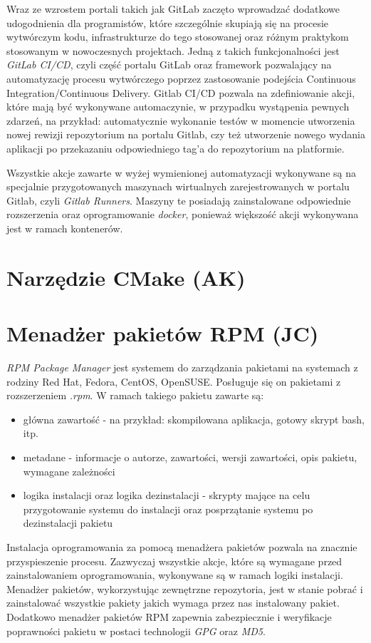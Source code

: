Wraz ze wzrostem portali takich jak GitLab zaczęto wprowadzać dodatkowe udogodnienia dla programistów, które szczególnie skupiają się na procesie wytwórczym kodu, infrastrukturze do tego stosowanej oraz różnym praktykom stosowanym w nowoczesnych projektach. Jedną z takich funkcjonalności jest \emph{GitLab CI/CD}, czyli część portalu GitLab oraz framework pozwalający na automatyzację procesu wytwórczego poprzez zastosowanie podejścia Continuous Integration/Continuous Delivery. Gitlab CI/CD pozwala na zdefiniowanie akcji, które mają być wykonywane automaczynie, w przypadku wystąpenia pewnych zdarzeń, na przykład: automatycznie wykonanie testów w momencie utworzenia nowej rewizji repozytorium na portalu Gitlab, czy też utworzenie nowego wydania aplikacji po przekazaniu odpowiedniego tag'a do repozytorium na platformie.

Wszystkie akcje zawarte w wyżej wymienionej automatyzacji wykonywane są na specjalnie przygotowanych maszynach wirtualnych zarejestrowanych w portalu Gitlab, czyli \emph{Gitlab Runners}. Maszyny te posiadają zainstalowane odpowiednie rozszerzenia oraz oprogramowanie \emph{docker}, ponieważ większość akcji wykonywana jest w ramach kontenerów.

\section{Narzędzie CMake (AK)}


\section{Menadżer pakietów RPM (JC)}
\emph{RPM Package Manager} jest systemem do zarządzania pakietami na systemach z rodziny Red Hat, Fedora, CentOS, OpenSUSE. Posługuje się on pakietami z rozszerzeniem \emph{.rpm}. W ramach takiego pakietu zawarte są:
\begin{itemize}
    \item główna zawartość - na przykład: skompilowana aplikacja, gotowy skrypt bash, itp.
    \item metadane - informacje o autorze, zawartości, wersji zawartości, opis pakietu, wymagane zależności
    \item logika instalacji oraz logika dezinstalacji - skrypty mające na celu przygotowanie systemu do instalacji oraz posprzątanie systemu po dezinstalacji pakietu
\end{itemize}

Instalacja oprogramowania za pomocą menadżera pakietów pozwala na znacznie przyspieszenie procesu. Zazwyczaj wszystkie akcje, które są wymagane przed zainstalowaniem oprogramowania, wykonywane są w ramach logiki instalacji. Menadżer pakietów, wykorzystując zewnętrzne repozytoria, jest w stanie pobrać i zainstalować wszystkie pakiety jakich wymaga przez nas instalowany pakiet. Dodatkowo menadżer pakietów RPM zapewnia zabezpiecznie i weryfikacje poprawności pakietu w postaci technologii \emph{GPG} oraz  \emph{MD5}.

